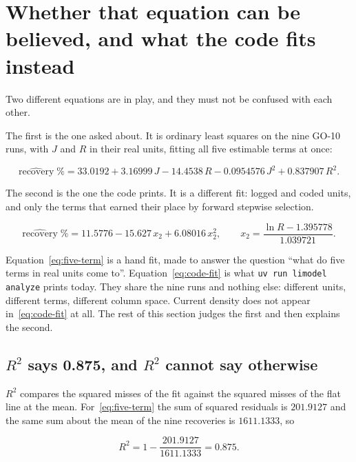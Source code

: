 \section{Whether that equation can be believed, and what the code fits instead}

Two different equations are in play, and they must not be confused with each other.

The first is the one asked about. It is ordinary least squares on the nine GO-10 runs, with
$J$ and $R$ in their real units, fitting all five estimable terms at once:

\begin{equation}
  \label{eq:five-term}
  \widehat{\text{recovery}}\;\%
  = 33.0192 + 3.16999\,J - 14.4538\,R - 0.0954576\,J^{2} + 0.837907\,R^{2}.
\end{equation}

The second is the one the code prints. It is a different fit: logged and coded units, and only
the terms that earned their place by forward stepwise selection.

\begin{equation}
  \label{eq:code-fit}
  \widehat{\text{recovery}}\;\%
  = 11.5776 - 15.627\,x_2 + 6.08016\,x_2^{2},
  \qquad x_2 = \frac{\ln R - 1.395778}{1.039721}.
\end{equation}

Equation~\eqref{eq:five-term} is a hand fit, made to answer the question ``what do five terms in
real units come to''. Equation~\eqref{eq:code-fit} is what \texttt{uv run limodel analyze} prints
today. They share the nine runs and nothing else: different units, different terms, different
column space. Current density does not appear in~\eqref{eq:code-fit} at all. The rest of this
section judges the first and then explains the second.

\subsection{$R^{2}$ says 0.875, and $R^{2}$ cannot say otherwise}

$R^{2}$ compares the squared misses of the fit against the squared misses of the flat line at
the mean. For~\eqref{eq:five-term} the sum of squared residuals is $201.9127$ and the same sum
about the mean of the nine recoveries is $1611.1333$, so

\begin{equation}
  R^{2} = 1 - \frac{201.9127}{1611.1333} = 0.875.
\end{equation}

